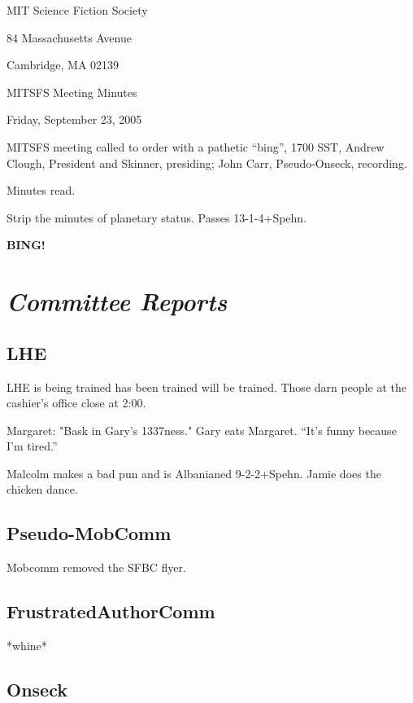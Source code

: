 \documentclass[10pt]{article}
\newcommand{\bing}{{\bf BING!} }
\newcommand{\goto}[1]{\bing \vskip 12pt \section*{{\em{#1}}}}
\begin{document}
\begin{center}

MIT Science Fiction Society

84 Massachusetts Avenue

Cambridge, MA 02139

\vspace{12pt}

MITSFS Meeting Minutes

Friday, September 23, 2005

\end{center}

\vspace{18pt}

\setlength{\parskip}{6pt}

\noindent
MITSFS meeting called to order with a pathetic ``bing'',
1700 SST, Andrew Clough, President and 
Skinner, presiding; John Carr,  Pseudo-Onseck, recording.

Minutes read.

Strip the minutes of planetary status.  Passes 13-1-4+Spehn.

\goto{Committee Reports}
\subsection*{LHE}
LHE is being trained has been trained will be trained.
Those darn people at the cashier's office close at 2:00.

Margaret: "Bask in Gary's 1337ness."
Gary eats Margaret.  ``It's funny because I'm tired.''

Malcolm makes a bad pun and is Albanianed 9-2-2+Spehn.
Jamie does the chicken dance.


\subsection*{Pseudo-MobComm}
Mobcomm removed the SFBC flyer.

\subsection*{FrustratedAuthorComm}
*whine*

\subsection*{Onseck}
\end{document}
